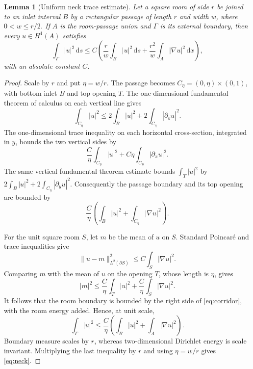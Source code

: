 \documentclass[11pt]{article}
\newtheorem{lemma}{Lemma}
\newcommand{\dd}{\,\mathrm d}
\begin{document}
\begin{lemma}[Uniform neck trace estimate]\label{lem:neck}
Let a square room of side $r$ be joined to an inlet interval $B$ by a
rectangular passage of length $r$ and width $w$, where $0<w\le r/2$.
If $A$ is the room-passage union and $\Gamma$ is its external boundary, then
every $u\in H^1(A)$ satisfies
\begin{equation}\label{eq:neck}
 \int_\Gamma|u|^2\dd s
 \le C\left(
 \frac rw\int_B|u|^2\dd s+
 \frac{r^2}{w}\int_A|\nabla u|^2\dd x
 \right),
\end{equation}
with an absolute constant $C$.
\end{lemma}

\begin{proof}
Scale by $r$ and put $\eta=w/r$.  The passage becomes
$C_\eta=(0,\eta)\times(0,1)$, with bottom inlet $B$ and top opening $T$.
The one-dimensional fundamental theorem of calculus on each vertical line
gives
\begin{equation}\label{eq:corridor-volume}
 \int_{C_\eta}|u|^2
 \le 2\int_B|u|^2+2\int_{C_\eta}|\partial_yu|^2.
\end{equation}
The one-dimensional trace inequality on each horizontal cross-section,
integrated in $y$, bounds the two vertical sides by
\[
 \frac C\eta\int_{C_\eta}|u|^2+C\eta
 \int_{C_\eta}|\partial_xu|^2.
\]
The same vertical fundamental-theorem estimate bounds $\int_T|u|^2$ by
$2\int_B|u|^2+2\int_{C_\eta}|\partial_yu|^2$.  Consequently the passage
boundary and its top opening are bounded by
\begin{equation}\label{eq:corridor}
 \frac C\eta\left(\int_B|u|^2+
 \int_{C_\eta}|\nabla u|^2\right).
\end{equation}

For the unit square room $S$, let $m$ be the mean of $u$ on $S$.  Standard
Poincar\'e and trace inequalities give
\[
 \|u-m\|_{L^2(\partial S)}^2\le C\int_S|\nabla u|^2.
\]
Comparing $m$ with the mean of $u$ on the opening $T$, whose length is
$\eta$, gives
\[
 |m|^2\le \frac C\eta\int_T|u|^2+
 \frac C\eta\int_S|\nabla u|^2.
\]
It follows that the room boundary is bounded by the right side of
\eqref{eq:corridor}, with the room energy added.  Hence, at unit scale,
\[
 \int_\Gamma|u|^2\le \frac C\eta
 \left(\int_B|u|^2+\int_A|\nabla u|^2\right).
\]
Boundary measure scales by $r$, whereas two-dimensional Dirichlet energy is
scale invariant.  Multiplying the last inequality by $r$ and using
$\eta=w/r$ gives \eqref{eq:neck}.
\end{proof}
\end{document}
